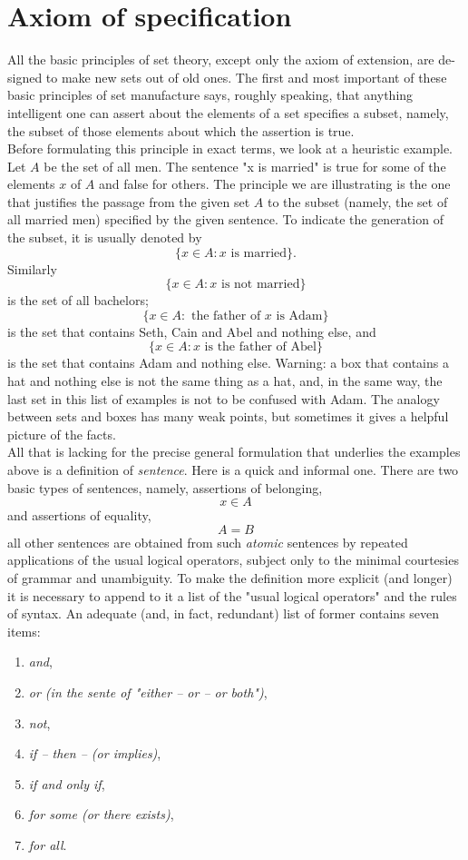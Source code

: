 \section{Axiom of specification}

All the basic principles of set theory, except only the axiom of extension, are de-
signed to make new sets out of old ones. The first and most important of these basic
principles of set manufacture says, roughly speaking, that anything intelligent one
can assert about the elements of a set specifies a subset, namely, the subset of those
elements about which the assertion is true. \\
Before formulating this principle in exact terms, we look at a heuristic example. Let $A$ be the set of all men. The sentence "x is married" is true for some of the elements $x$ of $A$ and false for others. The principle we are illustrating is the one that justifies the passage from the given set $A$ to the subset (namely, the set of all married men) specified by the given sentence. To indicate the generation of the subset, it is usually denoted by
\[
	\{ x \in A : x \text{ is married}\}.
\]
Similarly
\[
	\{ x \in A : x \text{ is not married}\}
\]
is the set of all bachelors;
\[
	\{ x \in A : \text{ the father of } x \text{ is Adam}\}
\]
is the set that contains Seth, Cain and Abel and nothing else, and
\[
	\{ x \in A: x \text{ is the father of Abel}\}
\]
is the set that contains Adam and nothing else. Warning: a box that contains a hat and nothing else is not the same thing as a hat, and, in the same way, the last set in this list of examples is not to be confused with Adam. The analogy between sets and boxes has many weak points, but sometimes it gives a helpful picture of the facts.\\

All that is lacking for the precise general formulation that underlies the examples above is a definition of \textit{sentence}. Here is a quick and informal one. There are two basic types of sentences, namely, assertions of belonging,
\[
	x \in A
\]
and assertions of equality,
\[
	A = B
\]
all other sentences are obtained from such \textit{atomic} sentences by repeated applications of the usual logical operators, subject only to the minimal courtesies of grammar and unambiguity. To make the definition more explicit (and longer) it is necessary to append to it a list of the "usual logical operators" and the rules of syntax. An adequate (and, in fact, redundant) list of former contains seven items:
\begin{enumerate}
	\item \textit{and},
	\item \textit{or (in the sente of "either -- or -- or both")},
	\item \textit{not},
	\item \textit{if -- then -- (or implies)},
	\item \textit{if and only if},
	\item \textit{for some (or there exists)},
	\item \textit{for all}.
\end{enumerate}

